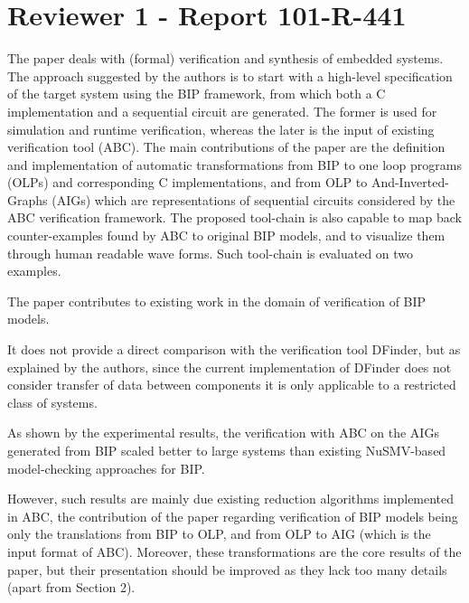 \section{Reviewer 1 - Report 101-R-441}
The paper deals with (formal) verification and synthesis of embedded systems.
The approach suggested by the authors is to start with a high-level 
specification of the target system using the BIP framework, from which both a 
C implementation and a sequential circuit are generated.
The former is used for simulation and runtime verification, whereas the later 
is the input of existing verification tool (ABC).
The main contributions of the paper are the definition and implementation of 
automatic transformations from BIP to one loop programs (OLPs) and 
corresponding C implementations, and from OLP to And-Inverted-Graphs (AIGs) 
which are representations of sequential circuits considered by the ABC 
verification framework.
The proposed tool-chain is also capable to map back counter-examples found by 
ABC to original BIP models, and to visualize them through human readable wave 
forms.
Such tool-chain is evaluated on two examples.

The paper contributes to existing work in the domain of verification of BIP 
models.

It does not provide a direct comparison with the verification tool DFinder, 
but as explained by the authors, since the current implementation of DFinder 
does not consider transfer of data between components it is only applicable 
to a restricted class of systems.




As shown by the experimental results, the verification with ABC on the AIGs 
generated from BIP scaled better to large systems than existing NuSMV-based 
model-checking approaches for BIP.

However, such results are mainly due existing reduction algorithms 
implemented in ABC, the contribution of the paper regarding verification of 
BIP models being only the translations from BIP to OLP, and from OLP to AIG 
(which is the input format of ABC).
Moreover, these transformations are the core results of the paper, but their 
presentation should be improved as they lack too many details (apart from 
Section 2).

